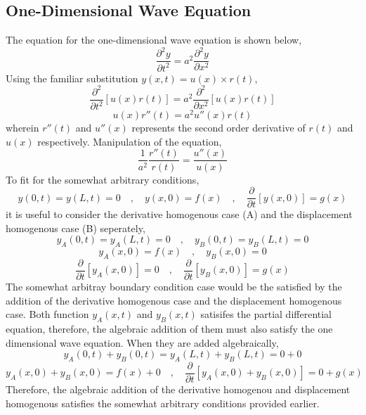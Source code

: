 \documentclass[a4paper, 12pt]{report}
\def\f{\frac}
\def\l{\left}
\def\r{\right}
\def\dst{\displaystyle}
\def\p{\partial}
\let\stdsection\section
\renewcommand\section{\newpage\stdsection}
\begin{document}
\begin{center}
\section{One-Dimensional Wave Equation}
\begin{comment}
\end{comment}
The equation for the one-dimensional wave equation is shown below,
$$\f{\p^2 y}{\p t^2} = a^2\f{\p^2 y}{\p x^2}$$ 
Using the familiar substitution $\dst{y(x,t) = u(x)\times r(t)}$,
$$\f{\p^2}{\p t^2}\l[u(x)r(t)\r] = a^2\f{\p^2}{\p x^2}\l[u(x)r(t)\r]$$ 
$$u(x)r''(t) = a^2u''(x)r(t)$$ 
wherein $r''(t)$ and $u''(x)$ represents the second order derivative of $r(t)$ and $u(x)$ respectively. Manipulation of the equation,
$$\f{1}{a^2}\f{r''(t)}{r(t)} = \f{u''(x)}{u(x)}$$
To fit for the somewhat arbitrary conditions,
$$y(0,t) = y(L,t) = 0\quad,\quad y(x,0) = f(x) \quad,\quad \f{\p}{\p t}\l[y(x,0)\r] = g(x)$$
it is useful to consider the derivative homogenous case (A) and the displacement homogenous case (B) seperately,
$$y_A(0,t) = y_A(L,t) = 0\quad,\quad y_B(0,t) = y_B(L,t) = 0$$
$$y_A(x,0) = f(x)\quad,\quad y_B(x,0) = 0$$
$$\f{\p }{\p t}[y_A(x,0)] = 0\quad,\quad \f{\p }{\p t}[y_B(x,0)] = g(x)$$
The somewhat arbitray boundary condition case would be the satisfied by the  addition of the derivative homogenous case  and the displacement homogenous case. Both function $y_A(x,t)$ and $y_B(x,t)$ satisifes the partial differential equation, therefore, the algebraic addition of them must also satisfy the one dimensional wave equation. When they are added algebraically,
$$y_A(0,t) + y_B(0,t) = y_A(L,t) + y_B(L,t) = 0 + 0$$
$$y_A(x,0) + y_B(x,0) = f(x) + 0\quad,\quad \f{\p}{\p t}\l[y_A(x,0) + y_B(x,0)\r] = 0 + g(x)$$
Therefore, the algebraic addition of the derivative homogenou and displacement homogenous satisfies the somewhat arbitrary conditions provided earlier.

\end{center}
\end{document}
